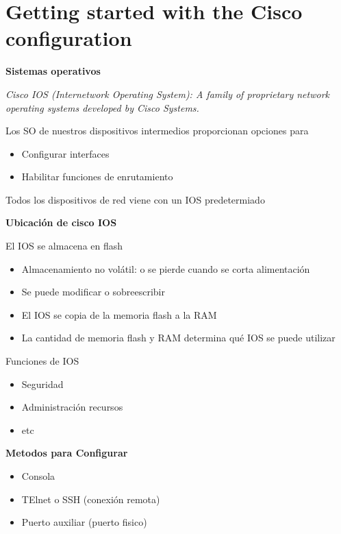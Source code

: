 \documentclass{article}
\begin{document}
\section{Getting started with the Cisco configuration}

\centering
{ \Large \textbf{Sistemas operativos}}
\vspace{1cm}

\emph{Cisco IOS (Internetwork Operating System): A family of proprietary network operating systems developed by Cisco Systems. }
\vspace{1cm}

Los SO de nuestros dispositivos intermedios proporcionan opciones para
\begin{itemize}
    \item Configurar interfaces
    \item Habilitar funciones de enrutamiento
\end{itemize}
\vspace{1cm}

Todos los dispositivos de red viene con un IOS predetermiado
\vspace{1cm}

\textbf{Ubicación de cisco IOS}

El IOS se almacena en flash
\begin{itemize}
    \item Almacenamiento no volátil: o se pierde cuando se corta alimentación
    \item Se puede modificar o sobreescribir
    \item El IOS se copia de la memoria flash a la RAM
    \item La cantidad de memoria flash y RAM determina qué IOS se puede utilizar
\end{itemize}

\vspace{1cm}

Funciones de IOS
\begin{itemize}
    \item Seguridad
    \item Administración recursos
    \item etc
\end{itemize}

\vspace{1cm}

\textbf{Metodos para Configurar}

\begin{itemize}
    \item Consola
    \item TElnet o SSH (conexión remota)
    \item Puerto auxiliar (puerto fisico)
\end{itemize}
\end{document}
